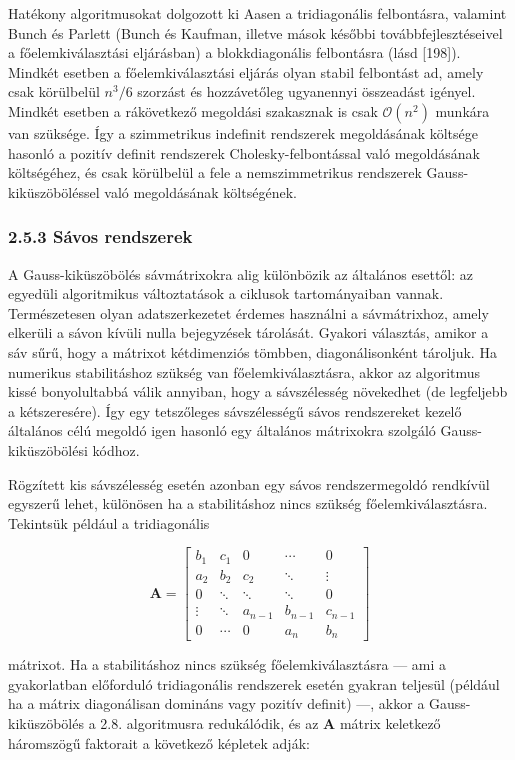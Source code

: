 \documentclass[
  magyar,
  11pt]{article}
\providecommand{\boldsymbol}[1]{\mathbf{#1}}
\begin{document}
Hatékony algoritmusokat dolgozott ki Aasen a tridiagonális felbontásra,
valamint Bunch és Parlett (Bunch és Kaufman, illetve mások későbbi
továbbfejlesztéseivel a főelemkiválasztási eljárásban) a blokkdiagonális
felbontásra (lásd {[}198{]}). Mindkét esetben a főelemkiválasztási
eljárás olyan stabil felbontást ad, amely csak körülbelül \(n^3/6\)
szorzást és hozzávetőleg ugyanennyi összeadást igényel. Mindkét esetben
a rákövetkező megoldási szakasznak is csak \(\mathcal{O}(n^2)\) munkára
van szüksége. Így a szimmetrikus indefinit rendszerek megoldásának
költsége hasonló a pozitív definit rendszerek Cholesky-felbontással való
megoldásának költségéhez, és csak körülbelül a fele a nemszimmetrikus
rendszerek Gauss-kiküszöböléssel való megoldásának költségének.

\subsubsection{2.5.3 Sávos rendszerek}\label{suxe1vos-rendszerek}

A Gauss-kiküszöbölés sávmátrixokra alig különbözik az általános esettől:
az egyedüli algoritmikus változtatások a ciklusok tartományaiban vannak.
Természetesen olyan adatszerkezetet érdemes használni a sávmátrixhoz,
amely elkerüli a sávon kívüli nulla bejegyzések tárolását. Gyakori
választás, amikor a sáv sűrű, hogy a mátrixot kétdimenziós tömbben,
diagonálisonként tároljuk. Ha numerikus stabilitáshoz szükség van
főelemkiválasztásra, akkor az algoritmus kissé bonyolultabbá válik
annyiban, hogy a sávszélesség növekedhet (de legfeljebb a kétszeresére).
Így egy tetszőleges sávszélességű sávos rendszereket kezelő általános
célú megoldó igen hasonló egy általános mátrixokra szolgáló
Gauss-kiküszöbölési kódhoz.

Rögzített kis sávszélesség esetén azonban egy sávos rendszermegoldó
rendkívül egyszerű lehet, különösen ha a stabilitáshoz nincs szükség
főelemkiválasztásra. Tekintsük például a tridiagonális

\[\mathbf{A} = \begin{bmatrix} b_1 & c_1 & 0 & \cdots & 0 \\ a_2 & b_2 & c_2 & \ddots & \vdots \\ 0 & \ddots & \ddots & \ddots & 0 \\ \vdots & \ddots & a_{n-1} & b_{n-1} & c_{n-1} \\ 0 & \cdots & 0 & a_n & b_n \end{bmatrix}\]

mátrixot. Ha a stabilitáshoz nincs szükség főelemkiválasztásra --- ami a
gyakorlatban előforduló tridiagonális rendszerek esetén gyakran teljesül
(például ha a mátrix diagonálisan domináns vagy pozitív definit) ---,
akkor a Gauss-kiküszöbölés a 2.8. algoritmusra redukálódik, és az
\(\boldsymbol{A}\) mátrix keletkező háromszögű faktorait a következő
képletek adják:
\end{document}
